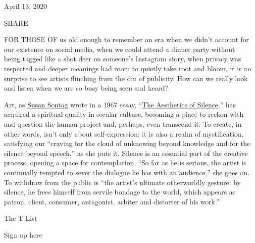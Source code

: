 April 13, 2020

SHARE

FOR THOSE OF us old enough to remember an era when we didn't account for
our existence on social media, when we could attend a dinner party
without being tagged like a shot deer on someone's Instagram story, when
privacy was respected and deeper meanings had room to quietly take root
and bloom, it is no surprise to see artists flinching from the din of
publicity. How can we really look and listen when we are so busy being
seen and heard?

Art, as
\href{https://www.nytimes3xbfgragh.onion/topic/person/susan-sontag}{Susan
Sontag} wrote in a 1967 essay,
``\href{http://www.susansontag.com/SusanSontag/books/stylesOfRadicalWillExerpt.shtml}{The
Aesthetics of Silence},'' has acquired a spiritual quality in secular
culture, becoming a place to reckon with and question the human project
and, perhaps, even transcend it. To create, in other words, isn't only
about self-expression; it is also a realm of mystification, satisfying
our ``craving for the cloud of unknowing beyond knowledge and for the
silence beyond speech,'' as she puts it. Silence is an essential part of
the creative process, opening a space for contemplation. ``So far as he
is serious, the artist is continually tempted to sever the dialogue he
has with an audience,'' she goes on. To withdraw from the public is
``the artist's ultimate otherworldly gesture: by silence, he frees
himself from servile bondage to the world, which appears as patron,
client, consumer, antagonist, arbiter and distorter of his work.''

The T List \textbar{}

Sign up here


